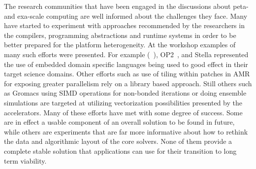The research communities that have been engaged in the discussions
about peta- and exa-scale computing are well informed about the
challenges they face. Many have started to experiment with approaches
recommended by the researchers in the compilers, programming
abstractions and runtime systems in order to be better prepared for
the platform heterogeneity. At the workshop examples of many such
efforts were presented.  For example (\hipacc~\cite{MHTKE12a}),
OP2~\cite{}, and Stella \cite{} represented the use of embedded domain
specific languages being used to good effect in their target science
domains. Other efforts such as use of tiling within patches in AMR for
exposing greater parallelism rely on a library based approach. Still
others such as Gromacs using SIMD operations for non-bonded iterations
or doing ensemble simulations are targeted at utilizing vectorization
possibilities presented by the accelerators. Many of these efforts
have met with some degree of success. Some are in effect a usable
component of an overall solution to be found in future, while others
are experiments that are far more informative about how to rethink the
data and algorithmic layout of the core solvers. None of them provide
a complete stable solution that applications can use for their
transition to long term viability. 


